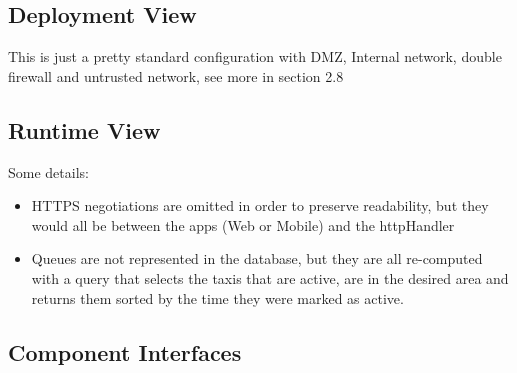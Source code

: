 \documentclass{article}
\begin{document}
\subsection{Deployment View}
\begin{figure}[H]
\end{figure}
		This is just a pretty standard configuration with DMZ, Internal network, double firewall and untrusted network, see more in section 2.8
\subsection{Runtime View}
Some details:
\begin{itemize}
	\item HTTPS negotiations are omitted in order to preserve readability, but they would all be between the apps (Web or Mobile)  and the httpHandler
	\item Queues are not represented in the database, but they are all re-computed with a query that selects the taxis that are active, are in the desired area and returns them sorted by the time they were marked as active.
\end{itemize}
\subsection{Component Interfaces}
\end{document}
